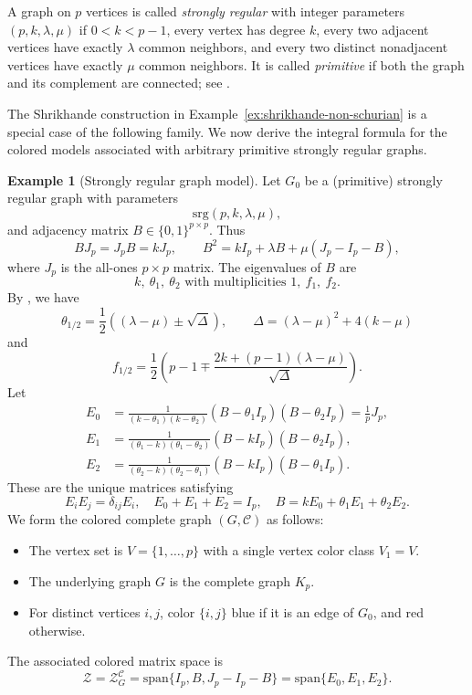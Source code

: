 \documentclass[12pt]{amsart}
\theoremstyle{plain}
\theoremstyle{definition}
\newtheorem{example}[theorem]{Example}
\theoremstyle{remark}
\newcommand{\1}{\mathbf{1}}
\begin{document}
A graph on $p$ vertices is called \emph{strongly regular}
with integer parameters $(p,k,\lambda,\mu)$ if $0<k<p-1$,
every vertex has degree $k$, every two adjacent vertices
have exactly $\lambda$ common neighbors, and every two
distinct nonadjacent vertices have exactly $\mu$ common neighbors.
It is called \emph{primitive} if both the graph and its complement
are connected; see \citet[Section~1.1]{srg}.

The Shrikhande construction in
Example~\ref{ex:shrikhande-non-schurian} is a special case of the following
family. We now derive the integral formula for the colored models associated
with arbitrary primitive strongly regular graphs.

\begin{example}[Strongly regular graph model]\label{ex:strongly-regular-graph-model}
Let $G_0$ be a (primitive) strongly regular graph with parameters
\[
\mathrm{srg}(p,k,\lambda,\mu),
\]
and adjacency matrix $B \in \{0,1\}^{p\times p}$. Thus
\begin{equation}\label{eq:srg-adjacency-identities}
BJ_p = J_pB = kJ_p,
\qquad
B^2 = kI_p + \lambda B + \mu(J_p - I_p - B),
\end{equation}
where $J_p$ is the all-ones $p\times p$ matrix. The eigenvalues of $B$ are
\[
k,\ \theta_1,\ \theta_2\mbox{ with multiplicities }
1,\ f_1,\ f_2.
\]
By \citet{srg}, we have
\[
\theta_{1/2} = \frac12((\lambda-\mu)\pm \sqrt{\Delta}),\qquad \Delta = (\lambda-\mu)^2+4(k-\mu)
\]
and
\[
f_{1/2} = \frac12\left(p-1\mp\frac{2k+(p-1)(\lambda-\mu)}{\sqrt{\Delta}} \right).
\]
Let 
\begin{align*}
E_0 &= \frac{1}{(k-\theta_1)(k-\theta_2)} (B-\theta_1 I_p)(B-\theta_2 I_p) = \frac{1}{p}J_p,\\
E_1 &= \frac{1}{(\theta_1-k)(\theta_1-\theta_2)} (B-k I_p)(B-\theta_2 I_p),\\
E_2 &= \frac{1}{(\theta_2-k)(\theta_2-\theta_1)} (B-k I_p)(B-\theta_1 I_p).
\end{align*}
These are the unique matrices satisfying
\[
E_i E_j=\delta_{ij}E_i,\quad
E_0+E_1+E_2=I_p,\quad B=k E_0+\theta_1 E_1+\theta_2 E_2.
\]
We form the colored complete graph $(G,\mathcal{C})$ as follows:
\begin{itemize}
    \item The vertex set is $V = \{1,\dots,p\}$ with a single vertex color class $V_1=V$.
    \item The underlying graph $G$ is the complete graph $K_p$.
    \item For distinct vertices $i,j$, color $\{i,j\}$ blue if it is an edge of $G_0$, and red otherwise.
\end{itemize}
The associated colored matrix space is
\[
\mathcal{Z}
= \mathcal{Z}_G^{\mathcal{C}}= \mathrm{span}\{I_p, B, J_p-I_p-B\}=\mathrm{span}\{E_0,E_1,E_2\}.
\]


\end{example}
\end{document}
